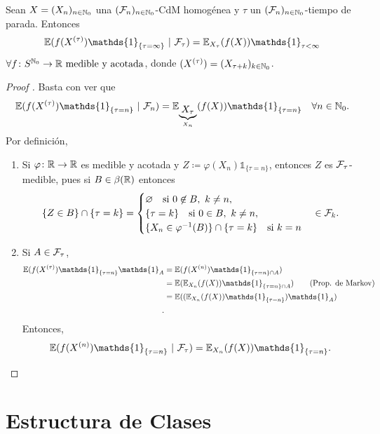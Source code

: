 \begin{theorem}
	Sean $X = (X_{n})_{n \in \mathbb{N}_{0}}$ una $(\mathcal{F}_{n})_{n \in \mathbb{N}_{0}}$-CdM homogénea y $\tau$ un $(\mathcal{F}_{n})_{n \in \mathbb{N}_{0}}$-tiempo de parada. Entonces
	\[ \mbb{E}(f(X^{(\tau)}) \mathds{1}_{\{\tau = \infty\}} \ | \ \mcal{F}_{\tau}) = \mbb{E}_{X_{\tau}}(f(X)) \mathds{1}_{\tau < \infty} \]
	$\forall f \colon S^{\mathbb{N}_{0}} \to \mathbb{R} \text{ medible y acotada}$, donde $(X^{(\tau)}) = (X_{\tau + k})_{k \in \mathbb{N}_{0}}$.
\end{theorem}
\begin{proof}[Proof ]
	Basta con ver que
	\[ \mbb{E}(f(X^{(\tau)}) \mathds{1}_{\{\tau = n\}} \ | \ \mcal{F}_{n}) = \mbb{E}_{\underbrace{X_{\tau}}_{X_{n}}} (f(X)) \mathds{1}_{\{\tau = n\}} \quad \forall n \in \N_{0}. \]
	Por definición,
	\begin{enumerate}
		\item Si $\varphi \colon \mathbb{R} \to \mathbb{R}$ es medible y acotada y $Z \coloneq \varphi(X_{n}) \mathds{1}_{\{\tau = n\}}$, entonces $Z$ es $\mathcal{F}_{\tau}$-medible, pues si $B \in \beta(\mathbb{R})$ entonces
		\[ \{Z \in B\} \cap \{\tau = k\} = \begin{cases}
			\varnothing \quad \text{si } 0 \not\in B,\ k \neq n, \\
			\{\tau = k\} \quad \text{si } 0 \in B,\ k \neq n, \\
			\{X_{n} \in \varphi^{-1}(B)\} \cap \{\tau = k\} \quad \text{si } k = n  
		\end{cases} \in \mathcal{F}_{k}. \]

		\item Si $A \in \mathcal{F}_{\tau}$,
		\begin{align*}
			\mbb{E}(f(X^{(\tau)}) \mathds{1}_{\{\tau = n\}} \mathds{1}_{A} &= \mbb{E}(f(X^{(n)}) \mathds{1}_{\{\tau = n\} \cap A}) \\
			&= \mbb{E}(\mbb{E}_{X_{n}}(f(X)) \mathds{1}_{\{\tau = n\} \cap A}) \tag{Prop. de Markov} \\
			&= \mbb{E}((\mbb{E}_{X_{n}}(f(X)) \mathds{1}_{\{\tau = n\}}) \mathds{1}_{A}) \\
		.\end{align*}
		Entonces,
		\[ \mbb{E}(f(X^{(n)}) \mathds{1}_{\{\tau = n\}} \ | \ \mcal{F}_{\tau}) = \mbb{E}_{X_{n}}(f(X)) \mathds{1}_{\{\tau = n\}}. \]
	\end{enumerate}
\end{proof}

\section{Estructura de Clases}

